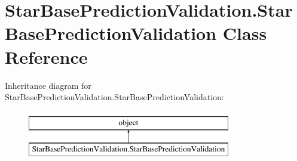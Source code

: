 \hypertarget{classStarBasePredictionValidation_1_1StarBasePredictionValidation}{\section{Star\-Base\-Prediction\-Validation.\-Star\-Base\-Prediction\-Validation Class Reference}
\label{classStarBasePredictionValidation_1_1StarBasePredictionValidation}
}
Inheritance diagram for Star\-Base\-Prediction\-Validation.\-Star\-Base\-Prediction\-Validation\-:\begin{figure}[H]
\begin{center}
\leavevmode
\includegraphics[height=2.000000cm]{classStarBasePredictionValidation_1_1StarBasePredictionValidation}
\end{center}
\end{figure}
